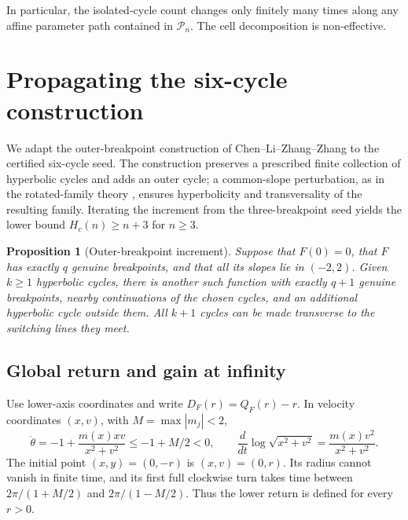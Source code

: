 \documentclass[11pt]{article}
\newtheorem{proposition}[theorem]{Proposition}
\theoremstyle{remark}
\begin{document}
In particular, the isolated-cycle count changes only finitely many times
along any affine parameter path contained in \(\mathcal P_n\).
The cell decomposition is non-effective.

\section{Propagating the six-cycle construction}\label{sec:lower}

We adapt the outer-breakpoint construction of Chen--Li--Zhang--Zhang
\cite[Section 3.1]{clzz} to the certified six-cycle seed.  The construction
preserves a prescribed finite collection of hyperbolic cycles and adds an
outer cycle; a common-slope perturbation, as in the rotated-family theory
\cite{ctz}, ensures hyperbolicity and transversality of the resulting
family.  Iterating the increment from the three-breakpoint seed yields
the lower bound \(H_c(n)\ge n+3\) for \(n\ge3\).

\begin{proposition}[Outer-breakpoint increment]\label{prop:increment}
Suppose that \(F(0)=0\), that \(F\) has exactly \(q\) genuine
breakpoints, and that all its slopes lie in \((-2,2)\).  Given
\(k\ge1\) hyperbolic cycles, there is another such function with exactly
\(q+1\) genuine breakpoints, nearby continuations of the chosen cycles,
and an additional hyperbolic cycle outside them.  All \(k+1\) cycles
can be made transverse to the switching lines they meet.
\end{proposition}

\subsection{Global return and gain at infinity}

Use lower-axis coordinates and write \(D_F(r)=Q_F(r)-r\).  In velocity
coordinates \((x,v)\), with \(M=\max|m_j|<2\),
\begin{equation}\label{eq:polar}
 \dot\theta=-1+\frac{m(x)xv}{x^2+v^2}\le-1+M/2<0,\qquad
 \frac d{dt}\log\sqrt{x^2+v^2}=\frac{m(x)v^2}{x^2+v^2}.
\end{equation}
The initial point \((x,y)=(0,-r)\) is \((x,v)=(0,r)\).  Its radius
cannot vanish in finite time, and its first full clockwise turn takes
time between \(2\pi/(1+M/2)\) and \(2\pi/(1-M/2)\).  Thus the
lower return is defined for every \(r>0\).
\end{document}
